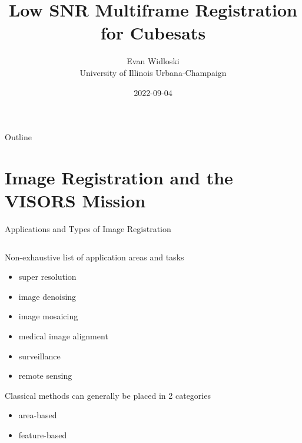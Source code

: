 \documentclass[10pt,xcolor=dvipsnames]{beamer}
\title{Low SNR Multiframe Registration for Cubesats}
\author{Evan Widloski \\ University of Illinois Urbana-Champaign}
\date{2022-09-04}
\begin{document}

\begin{frame}
\titlepage
\end{frame}

\begin{frame}{Outline}
\tableofcontents
\end{frame}


\section{Image Registration and the VISORS Mission}

\begin{frame}{Applications and Types of Image Registration}
  \begin{columns}
    \begin{column}{0.5 \textwidth}
      Non-exhaustive list of application areas and tasks
      \begin{itemize}
        \item super resolution
        \item image denoising
        \item image mosaicing
        \item medical image alignment
        \item surveillance
        \item remote sensing
      \end{itemize}

      Classical methods can generally be placed in 2 categories
      \begin{itemize}
        \item area-based
        \item feature-based
      \end{itemize}

    \end{column}


\end{columns}
\end{frame}
\end{document}
